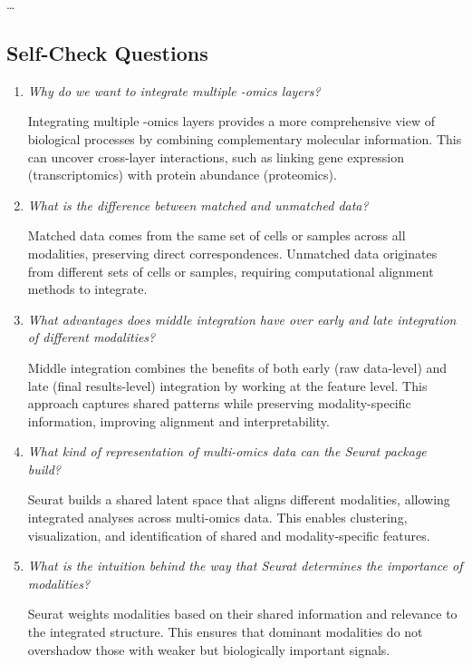 \documentclass[a4paper]{article}
\begin{document}
\dots

\subsection*{Self-Check Questions}

\begin{enumerate}

    \item \textit{Why do we want to integrate multiple -omics layers?}  
    
    Integrating multiple -omics layers provides a more comprehensive view of biological processes by combining complementary molecular information.  
    This can uncover cross-layer interactions, such as linking gene expression (transcriptomics) with protein abundance (proteomics).  

    \item \textit{What is the difference between matched and unmatched data?}  
    
    Matched data comes from the same set of cells or samples across all modalities, preserving direct correspondences.  
    Unmatched data originates from different sets of cells or samples, requiring computational alignment methods to integrate.  

    \item \textit{What advantages does middle integration have over early and late integration of different modalities?}  
    
    Middle integration combines the benefits of both early (raw data-level) and late (final results-level) integration by working at the feature level.  
    This approach captures shared patterns while preserving modality-specific information, improving alignment and interpretability.  

    \item \textit{What kind of representation of multi-omics data can the Seurat package build?}  
    
    Seurat builds a shared latent space that aligns different modalities, allowing integrated analyses across multi-omics data.  
    This enables clustering, visualization, and identification of shared and modality-specific features.  

    \item \textit{What is the intuition behind the way that Seurat determines the importance of modalities?}  
    
    Seurat weights modalities based on their shared information and relevance to the integrated structure.  
    This ensures that dominant modalities do not overshadow those with weaker but biologically important signals.  


\end{enumerate}
\end{document}
